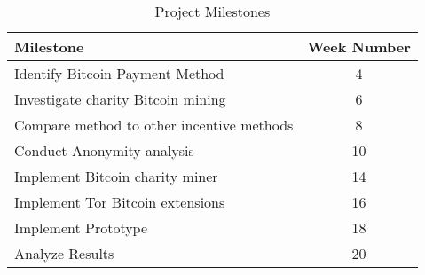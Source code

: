 \documentclass[letterpaper]{article}
\begin{document}
\begin{table}
  \centering
  \begin{tabular}{l | c}
    Milestone & Week Number\\
    \hline

    Identify Bitcoin Payment Method & 4\\
    Investigate charity Bitcoin mining & 6\\
    Compare method to other incentive methods & 8 \\
    Conduct Anonymity analysis & 10 \\
    Implement Bitcoin charity miner & 14 \\
    Implement Tor Bitcoin extensions & 16 \\
    Implement Prototype & 18 \\
    Analyze Results & 20

  \end{tabular}
  \caption{Project Milestones}
  \label{tab:milestones}
\end{table}







\end{document}
